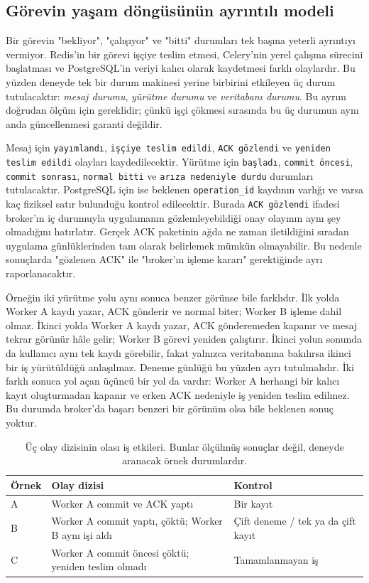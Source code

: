 \documentclass[conference,a4paper]{IEEEtran}
\newcommand{\code}[1]{\texttt{#1}}
\begin{document}
\subsection{Görevin yaşam döngüsünün ayrıntılı modeli}
Bir görevin "bekliyor", "çalışıyor" ve "bitti" durumları tek başına yeterli ayrıntıyı vermiyor. Redis'in bir görevi işçiye teslim etmesi, Celery'nin yerel çalışma sürecini başlatması ve PostgreSQL'in veriyi kalıcı olarak kaydetmesi farklı olaylardır. Bu yüzden deneyde tek bir durum makinesi yerine birbirini etkileyen üç durum tutulacaktır: \emph{mesaj durumu}, \emph{yürütme durumu} ve \emph{veritabanı durumu}. Bu ayrım doğrudan ölçüm için gereklidir; çünkü işçi çökmesi sırasında bu üç durumun aynı anda güncellenmesi garanti değildir.

Mesaj için \code{yayımlandı}, \code{işçiye teslim edildi}, \code{ACK gözlendi} ve \code{yeniden teslim edildi} olayları kaydedilecektir. Yürütme için \code{başladı}, \code{commit öncesi}, \code{commit sonrası}, \code{normal bitti} ve \code{arıza nedeniyle durdu} durumları tutulacaktır. PostgreSQL için ise beklenen \code{operation\_id} kaydının varlığı ve varsa kaç fiziksel satır bulunduğu kontrol edilecektir. Burada \code{ACK gözlendi} ifadesi broker'ın iç durumuyla uygulamanın gözlemleyebildiği onay olayının aynı şey olmadığını hatırlatır. Gerçek ACK paketinin ağda ne zaman iletildiğini sıradan uygulama günlüklerinden tam olarak belirlemek mümkün olmayabilir. Bu nedenle sonuçlarda "gözlenen ACK" ile "broker'ın işleme kararı" gerektiğinde ayrı raporlanacaktır.

Örneğin iki yürütme yolu aynı sonuca benzer görünse bile farklıdır. İlk yolda Worker A kaydı yazar, ACK gönderir ve normal biter; Worker B işleme dahil olmaz. İkinci yolda Worker A kaydı yazar, ACK gönderemeden kapanır ve mesaj tekrar görünür hâle gelir; Worker B görevi yeniden çalıştırır. İkinci yolun sonunda da kullanıcı aynı tek kaydı görebilir, fakat yalnızca veritabanına bakılırsa ikinci bir iş yürütüldüğü anlaşılmaz. Deneme günlüğü bu yüzden ayrı tutulmalıdır. İki farklı sonuca yol açan üçüncü bir yol da vardır: Worker A herhangi bir kalıcı kayıt oluşturmadan kapanır ve erken ACK nedeniyle iş yeniden teslim edilmez. Bu durumda broker'da başarı benzeri bir görünüm olsa bile beklenen sonuç yoktur.

\begin{table}[t]
\caption{Üç olay dizisinin olası iş etkileri. Bunlar ölçülmüş sonuçlar değil, deneyde aranacak örnek durumlardır.}
\centering\footnotesize
\begin{tabularx}{\columnwidth}{@{}p{12mm}X p{21mm}@{}}
\toprule
Örnek & Olay dizisi & Kontrol\\
\midrule
A & Worker A commit ve ACK yaptı & Bir kayıt\\
B & Worker A commit yaptı, çöktü; Worker B aynı işi aldı & Çift deneme / tek ya da çift kayıt\\
C & Worker A commit öncesi çöktü; yeniden teslim olmadı & Tamamlanmayan iş\\
\bottomrule
\end{tabularx}
\label{tab:traces}
\end{table}
\end{document}
